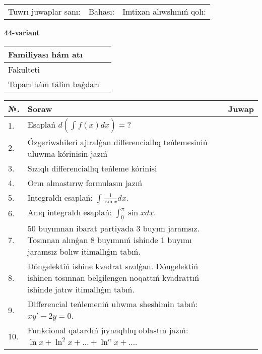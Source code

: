 \documentclass{article}
\begin{document}
\vspace{1cm}

\begin{tabular}{ c c c }
Tuwrı juwaplar sanı: \underline{\hspace{2cm}} & Bahası: \underline{\hspace{2cm}} & Imtixan alıwshınıń qolı: \underline{\hspace{2cm}} \\
\end{tabular}

\newpage

\begin{center}\textbf{44-variant}\end{center}

\bgroup
\def\arraystretch{1.5}
\begin{tabular}{ |m{6cm}|m{10cm}| }
  \hline
  Familiyası hám atı & \\
  \hline
  Fakulteti &\\
  \hline
  Toparı hám tálim baǵdarı & \\
  \hline
\end{tabular}
\egroup

\vspace{0.5cm}

\bgroup
\def\arraystretch{2}
\begin{tabular}{ |l|m{8cm}|m{7cm}| }
  \hline
  №. & Soraw & Juwap \\
  \hline
  1. & Esaplań $\displaystyle d\left( \int_{}^{}{f(x)dx} \right) = ?$ &  \\
  \hline
  2. & Ózgeriwshileri ajıralǵan differenciallıq teńlemesiniń uluwma kórinisin jazıń &  \\
  \hline
  3. & Sızıqlı differenciallıq teńleme kórinisi &  \\
  \hline
  4. & Orın almastırıw formulasın jazıń &  \\
  \hline
  5. & Integraldı esaplań: $\displaystyle\int {\frac{1}{\sin x}dx} $. &  \\
  \hline
  6. & Anıq integraldı esaplań: $\displaystyle\int_{0}^{\pi}\sin xdx$. &  \\
  \hline
  7. & 50 buyımnan ibarat partiyada 3 buyım jaramsız. Tosınnan alınǵan 8 buyımnıń ishinde 1 buyımı jaramsız bolıw itimallıǵın tabıń. &  \\
  \hline
  8. & Dóngelektiń ishine kvadrat sızılǵan. Dóngelektiń ishinen tosınnan belgilengen noqattıń kvadrattıń ishinde jatıw itimallıǵın tabıń. &  \\
  \hline
  9. & Differencial teńlemeniń ulıwma sheshimin tabıń: $xy' - 2y = 0$. &  \\
  \hline
  10. & Funkcional qatardıń jıynaqlılıq oblastın jazıń: $\ln x + \ln^{2}x + \ldots + \ln^{n}x + \ldots$. &  \\
  \hline
\end{tabular}
\egroup
\end{document}
